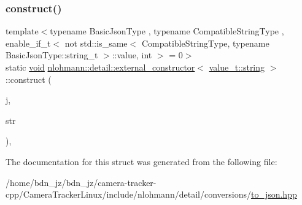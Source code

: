 \mbox{\label{structnlohmann_1_1detail_1_1external__constructor_3_01value__t_1_1string_01_4_a8822d43f0e20c5a28be329f9ca7de6c4}} 
\subsubsection{\texorpdfstring{construct()}{construct()}\hspace{0.1cm}{\footnotesize\ttfamily [3/3]}}
{\footnotesize\ttfamily template$<$typename Basic\+Json\+Type , typename Compatible\+String\+Type , enable\+\_\+if\+\_\+t$<$ not std\+::is\+\_\+same$<$ Compatible\+String\+Type, typename Basic\+Json\+Type\+::string\+\_\+t $>$\+::value, int $>$  = 0$>$ \\
static \hyperlink{namespacenlohmann_1_1detail_a59fca69799f6b9e366710cb9043aa77d}{void} \hyperlink{structnlohmann_1_1detail_1_1external__constructor}{nlohmann\+::detail\+::external\+\_\+constructor}$<$ \hyperlink{namespacenlohmann_1_1detail_a1ed8fc6239da25abcaf681d30ace4985ab45cffe084dd3d20d928bee85e7b0f21}{value\+\_\+t\+::string} $>$\+::construct (\begin{DoxyParamCaption}\item[{Basic\+Json\+Type \&}]{j,  }\item[{const Compatible\+String\+Type \&}]{str }\end{DoxyParamCaption})\hspace{0.3cm}{\ttfamily [inline]}, {\ttfamily [static]}}



The documentation for this struct was generated from the following file\+:\begin{DoxyCompactItemize}
\item 
/home/bdn\+\_\+jz/bdn\+\_\+jz/camera-\/tracker-\/cpp/\+Camera\+Tracker\+Linux/include/nlohmann/detail/conversions/\hyperlink{to__json_8hpp}{to\+\_\+json.\+hpp}\end{DoxyCompactItemize}

